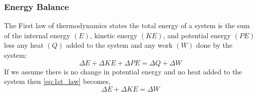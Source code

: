 \subsubsection{Energy Balance}
The First law of thermodynamics states the total energy of a system is the sum of the internal energy $(E)$, kinetic energy $(KE)$, and potential energy $(PE)$ less any heat $(Q)$ added to the system and any work $(W)$ done by the system:
\begin{equation} \label{eq:1st_law}
\Delta E + \Delta KE + \Delta PE = \Delta Q + \Delta W
\end{equation}
If we assume there is no change in potential energy and no heat added to the system then \ref{eq:1st_law} becomes,
\begin{equation} \label{eq:1st_law_no_q}
\Delta E + \Delta KE = \Delta W
\end{equation}

